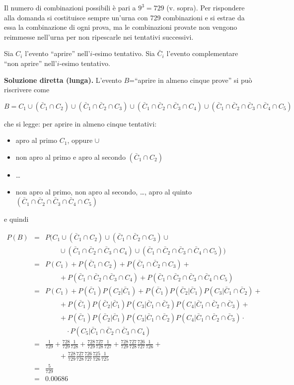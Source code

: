 \documentclass[
  11pt,
]{book}
\providecommand{\tightlist}{%
  \setlength{\itemsep}{0pt}\setlength{\parskip}{0pt}}
\theoremstyle{mytheoremstyle}
\theoremstyle{mydefstyle}
\newenvironment{sol}
  {
  \begin{tcolorbox}[enhanced,breakable,arc=0.1mm,boxrule=1pt,colback=white,colframe=iblue,
  title=\bf \fontfamily{lmss}\selectfont \hspace{.5 cm} Soluzione,drop fuzzy shadow]

}{
\end{tcolorbox}
  }
\begin{document}
\begin{sol}
Il numero di combinazioni possibili è pari a \(9^{3}= 729\) (v. sopra).
Per rispondere alla domanda si costituisce sempre un'urna con 729
combinazioni e si estrae da essa la combinazione di ogni prova,
ma le combinazioni provate non vengono reimmesse nell'urna per
non ripescarle nei tentativi successivi.

Sia \(C_{i}\) l'evento ``aprire'' nell'\(i\)-esimo tentativo.
Sia \(\bar{C}_{i}\) l'evento complementare ``non aprire''
nell'\(i\)-esimo tentativo.

\textbf{Soluzione diretta (lunga).}
L'evento \(B\)=``aprire in almeno cinque prove'' si può riscrivere come

\[
B=C_1\cup (\bar C_1\cap C_2)\cup (\bar C_1\cap \bar C_2\cap C_3)\cup (\bar C_1\cap \bar C_2\cap \bar C_3\cap C_4)\cup (\bar C_1\cap \bar C_2\cap \bar C_3\cap\bar C_4\cap C_5)
\]

che si legge: per aprire in almeno cinque tentativi:

\begin{itemize}
\tightlist
\item
  apro al primo \(C_1\), oppure \(\cup\)
\item
  non apro al primo e apro al secondo \((\bar C_1\cap C_2)\)
\item
  \ldots{}
\item
  non apro al primo, non apro al secondo, \ldots, apro al quinto \((\bar C_1\cap \bar C_2\cap \bar C_3\cap\bar C_4\cap C_5)\)
\end{itemize}

e quindi

\[\begin{array}{lll}
P(B)   &=&  P\Big(C_1\cup (\bar C_1\cap C_2) \cup (\bar C_1\cap \bar C_2\cap C_3)\cup \\
&& \qquad\cup(\bar C_1\cap \bar C_2\cap \bar C_3\cap C_4)\cup (\bar C_1\cap \bar C_2\cap \bar C_3\cap\bar C_4\cap C_5)\Big)\\
&=& P(C_1)+P(\bar C_1\cap C_2)+P(\bar C_1\cap \bar C_2\cap C_3)+\\
&&\qquad + P(\bar C_1\cap \bar C_2\cap \bar C_3\cap C_4)+P(\bar C_1\cap \bar C_2\cap \bar C_3\cap\bar C_4\cap C_5)\\
&=& P(C_1)+P(\bar C_1) P( C_2|\bar C_1)+P(\bar C_1) P( \bar C_2|\bar C_1) P( C_3|\bar C_1\cap \bar C_2)+ \\
&&\qquad+P(\bar C_1) P( \bar C_2|\bar C_1) P( C_3|\bar C_1\cap \bar C_2)P( C_4|\bar C_1\cap \bar C_2\cap\bar C_3)+\\
&&\qquad+P(\bar C_1) P( \bar C_2|\bar C_1) P( C_3|\bar C_1\cap \bar C_2)P( C_4|\bar C_1\cap \bar C_2\cap\bar C_3)\cdot\\
&&\qquad\quad\cdot P( C_5|\bar C_1\cap \bar C_2\cap\bar C_3\cap C_4)\\
&=& \frac 1{729} + \frac {728}{729}\frac {1}{728} + \frac {728}{729}\frac {727}{728}\frac {1}{727}+\frac {728}{729}\frac {727}{728}\frac {726}{727}\frac {1}{726}+\\
&&\qquad +\frac {728}{729}\frac {727}{728}\frac {726}{727}\frac {725}{726}\frac{1}{725}\\
&=&\frac 5{729}\\
&=& 0.00686
\end{array}\]


\end{sol}
\end{document}
